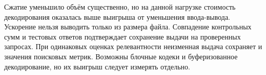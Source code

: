 \conclusions
Сжатие уменьшило объём существенно, но на данной нагрузке стоимость
декодирования оказалась выше выигрыша от уменьшения ввода-вывода.
Ускорение нельзя выводить только из размера файла. Совпадение
контрольных сумм и тестовых ответов подтверждает сохранение выдачи
на проверенных запросах. При одинаковых оценках релевантности
неизменная выдача сохраняет и значения поисковых метрик.
Возможны блочные кодеки и буферизованное
декодирование, но их выигрыш следует измерять отдельно.
